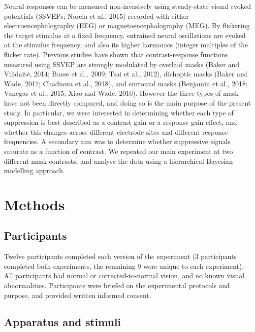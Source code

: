\documentclass[]{article}
\begin{document}
Neural responses can be measured non-invasively using steady-state visual evoked potentials (SSVEPs; Norcia et al., 2015) recorded with either electroencephalography (EEG) or magnetoencephalography (MEG). By flickering the target stimulus at a fixed frequency, entrained neural oscillations are evoked at the stimulus frequency, and also its higher harmonics (integer multiples of the flicker rate). Previous studies have shown that contrast-response functions measured using SSVEP are strongly modulated by overlaid masks (Baker and Vilidaitė, 2014; Busse et al., 2009; Tsai et al., 2012), dichoptic masks (Baker and Wade, 2017; Chadnova et al., 2018), and surround masks (Benjamin et al., 2018; Vanegas et al., 2015; Xiao and Wade, 2010). However the three types of mask have not been directly compared, and doing so is the main purpose of the present study. In particular, we were interested in determining whether each type of suppression is best described as a contrast gain or a response gain effect, and whether this changes across different electrode sites and different response frequencies. A secondary aim was to determine whether suppressive signals saturate as a function of contrast. We repeated our main experiment at two different mask contrasts, and analyse the data using a hierarchical Bayesian modelling approach.

\hypertarget{methods}{%
\section{Methods}\label{methods}}

\hypertarget{participants}{%
\subsection{Participants}\label{participants}}

Twelve participants completed each version of the experiment (3 participants completed both experiments, the remaining 9 were unique to each experiment). All participants had normal or corrected-to-normal vision, and no known visual abnormalities. Participants were briefed on the experimental protocols and purpose, and provided written informed consent.

\hypertarget{apparatus-and-stimuli}{%
\subsection{Apparatus and stimuli}\label{apparatus-and-stimuli}}
\end{document}
